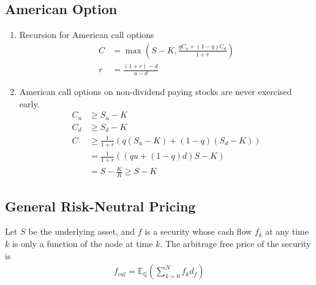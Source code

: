\documentclass[12pt,twoside]{article}
\begin{document}
\subsection{American Option}	
\begin{enumerate}
	\item Recursion for American call options
	\begin{align*}
		C &= \max\left(S-K, \frac{qC_u + (1-q)C_d}{1+r}\right)\\
		r & = \frac{(1+r)-d}{u-d}
	\end{align*}

	\item American call options on non-dividend paying stocks are never exercised early.
	\begin{align*}
		C_u 	& \geq S_u - K\\
		C_d 	& \geq S_d - K\\
		C		& \geq \frac{1}{1+r}\left(q(S_u-K) + (1-q)(S_d-K)\right)\\
				& = \frac{1}{1+r}\left((qu +(1-q)d)S -K \right)\\
				& = S - \frac{K}{R} \geq S-K
	\end{align*}

\end{enumerate}

\subsection{General Risk-Neutral Pricing}
Let $S$ be the underlying asset, and $f$ is a security whose cash flow $f_k$ at any time $k$ is only a function of the node at time $k$. The arbitrage free price of the security is
\begin{align*}
	f_{val} = \mathbb{E}_{\mathbb{Q}} \left(\sum_{k=0}^N f_k d_f\right)
\end{align*}
\end{document}
